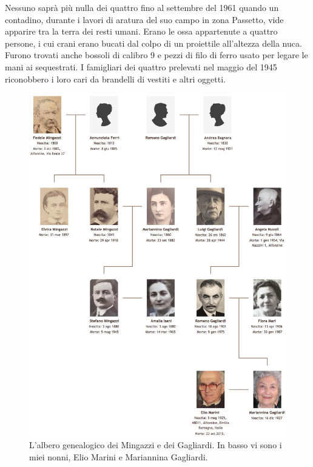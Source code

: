 Nessuno saprà più nulla dei quattro fino al settembre del 1961 quando un contadino, durante i lavori di aratura del suo campo in zona Passetto, vide apparire tra la terra dei resti umani. Erano le ossa appartenute a quattro persone, i cui crani erano bucati dal colpo di un proiettile all'altezza della nuca. Furono trovati anche bossoli di calibro 9 e pezzi di filo di ferro usato per legare le mani ai sequestrati. I famigliari dei quattro prelevati nel maggio del 1945 riconobbero i loro cari da brandelli di vestiti e altri oggetti.

 \begin{figure}[htb]
    \centering
    \includegraphics[width=\textwidth]{albero}
    \caption[Albero Genealogico]{L'albero genealogico dei Mingazzi e dei Gagliardi. In basso vi sono i miei nonni, Elio Marini e Mariannina Gagliardi.}
\end{figure}
